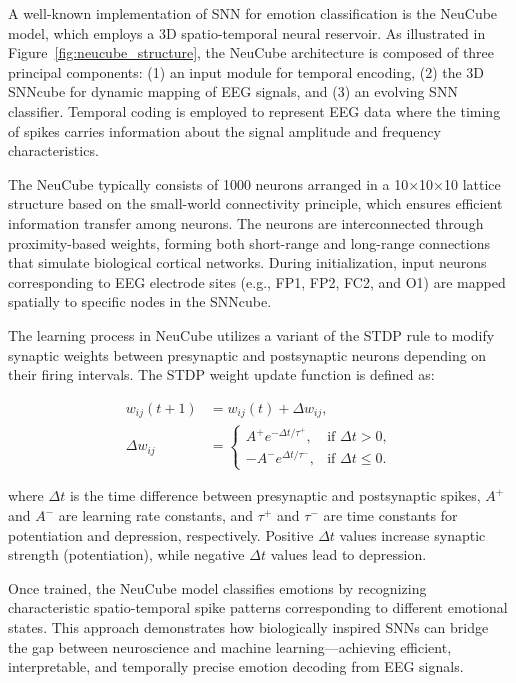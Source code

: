 \documentclass[conference]{IEEEtran}
\begin{document}
A well-known implementation of SNN for emotion classification is the NeuCube model, which employs a 3D spatio-temporal neural reservoir. As illustrated in Figure~\ref{fig:neucube_structure}, the NeuCube architecture is composed of three principal components: (1) an input module for temporal encoding, (2) the 3D SNNcube for dynamic mapping of EEG signals, and (3) an evolving SNN classifier. Temporal coding is employed to represent EEG data where the timing of spikes carries information about the signal amplitude and frequency characteristics.

The NeuCube typically consists of 1000 neurons arranged in a 10×10×10 lattice structure based on the small-world connectivity principle, which ensures efficient information transfer among neurons. The neurons are interconnected through proximity-based weights, forming both short-range and long-range connections that simulate biological cortical networks. During initialization, input neurons corresponding to EEG electrode sites (e.g., FP1, FP2, FC2, and O1) are mapped spatially to specific nodes in the SNNcube.

The learning process in NeuCube utilizes a variant of the STDP rule to modify synaptic weights between presynaptic and postsynaptic neurons depending on their firing intervals. The STDP weight update function is defined as:

\begin{equation}
\begin{aligned}
w_{ij}(t + 1) &= w_{ij}(t) + \Delta w_{ij}, \\
\Delta w_{ij} &=
\begin{cases}
A^+ e^{-\Delta t / \tau^+}, & \text{if } \Delta t > 0, \\
-A^- e^{\Delta t / \tau^-}, & \text{if } \Delta t \leq 0.
\end{cases}
\end{aligned}
\end{equation}

where \(\Delta t\) is the time difference between presynaptic and postsynaptic spikes, \(A^+\) and \(A^-\) are learning rate constants, and \(\tau^+\) and \(\tau^-\) are time constants for potentiation and depression, respectively. Positive \(\Delta t\) values increase synaptic strength (potentiation), while negative \(\Delta t\) values lead to depression.

Once trained, the NeuCube model classifies emotions by recognizing characteristic spatio-temporal spike patterns corresponding to different emotional states. This approach demonstrates how biologically inspired SNNs can bridge the gap between neuroscience and machine learning—achieving efficient, interpretable, and temporally precise emotion decoding from EEG signals.
\end{document}
